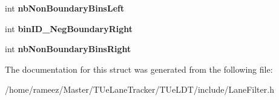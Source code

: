 \begin{DoxyCompactItemize}
\item 
\hypertarget{structBaseHistogramModel_a3b74b913158fec0ba82298d40b30b238}{int {\bfseries nb\-Non\-Boundary\-Bins\-Left}}\label{structBaseHistogramModel_a3b74b913158fec0ba82298d40b30b238}

\item 
\hypertarget{structBaseHistogramModel_adf103bbe2f65b82dbfa0f5fe3301031a}{int {\bfseries bin\-I\-D\-\_\-\-Neg\-Boundary\-Right}}\label{structBaseHistogramModel_adf103bbe2f65b82dbfa0f5fe3301031a}

\item 
\hypertarget{structBaseHistogramModel_af19b255aae30a4762453fcbeab0c5128}{int {\bfseries nb\-Non\-Boundary\-Bins\-Right}}\label{structBaseHistogramModel_af19b255aae30a4762453fcbeab0c5128}

\end{DoxyCompactItemize}


The documentation for this struct was generated from the following file\-:\begin{DoxyCompactItemize}
\item 
/home/rameez/\-Master/\-T\-Ue\-Lane\-Tracker/\-T\-Ue\-L\-D\-T/include/Lane\-Filter.\-h\end{DoxyCompactItemize}
